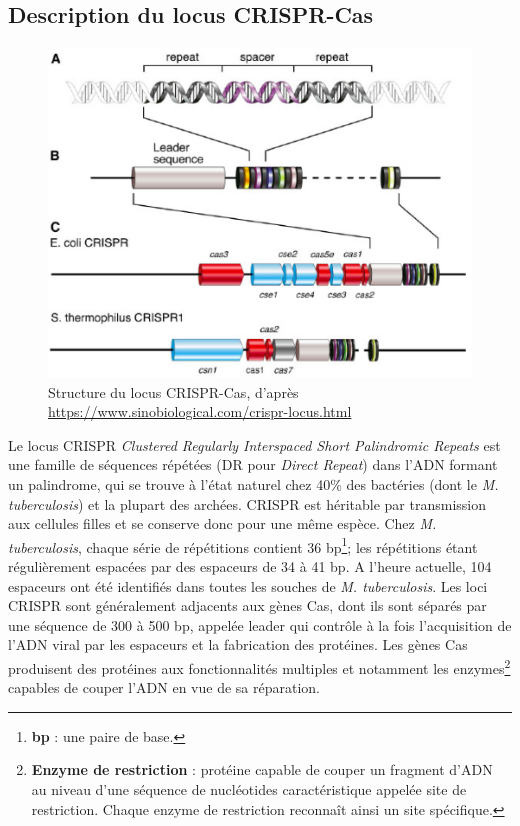 \documentclass[twoside,a4paper,11pt,frenchb,openany]{report}
\begin{document}

\subsection{Description du locus CRISPR-Cas}

\begin{figure}[h!]
\centering
\includegraphics[scale=0.6]{crispr.png}
\caption{Structure du locus CRISPR-Cas, d'après\\ \url{https://www.sinobiological.com/crispr-locus.html}}
\end{figure}

Le locus CRISPR \textit{Clustered Regularly Interspaced Short Palindromic Repeats} est une famille de séquences répétées (DR pour \textit{Direct Repeat}) dans l'ADN formant un palindrome, qui se trouve à l'état naturel chez 40\% des bactéries (dont le \textit{M. tuberculosis}) et la plupart des archées. CRISPR est héritable par transmission aux cellules filles et se conserve donc pour une même espèce. Chez \textit{M. tuberculosis}, chaque série de répétitions contient 36 bp\footnote{\textbf{bp} : une paire de base.}; les répétitions étant régulièrement espacées par des espaceurs de 34 à 41 bp. A l'heure actuelle, 104 espaceurs ont été identifiés dans toutes les souches de \textit{M. tuberculosis}. Les loci CRISPR sont généralement adjacents aux gènes Cas, dont ils sont séparés par une séquence de 300 à 500 bp, appelée leader qui contrôle à la fois l'acquisition de l'ADN viral par les espaceurs et la fabrication des protéines. Les gènes Cas produisent des protéines aux fonctionnalités multiples et notamment les enzymes\footnote{\textbf{Enzyme de restriction} : protéine capable de couper un fragment d'ADN au niveau d'une séquence de nucléotides caractéristique appelée site de restriction. Chaque enzyme de restriction reconnaît ainsi un site spécifique.} capables de couper l'ADN en vue de sa réparation.
\end{document}
